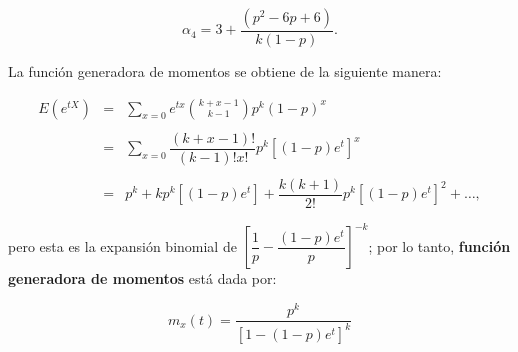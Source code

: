 \begin{tcolorbox}
    $$\alpha_4 = 3+\dfrac{(p^2-6p+6)}{k(1-p)}.$$
\end{tcolorbox}

La función generadora de momentos se obtiene de la siguiente manera:

$$\begin{array}{rcl}
    E(e^{tX})&=&\sum_{x=0}e^{tx} {k+x-1 \choose k-1} p^k(1-p)^x \\\\
	     &=& \sum_{x=0} \dfrac{(k+x-1)!}{(k-1)!x!} p^k[(1-p)e^t]^x \\\\
	     &=& p^k + kp^k [(1-p)e^t] + \dfrac{k(k+1)}{2!} p^k[(1-p)e^t]^2 +\ldots,\\\\
\end{array}$$
pero esta es la expansión binomial de $\left[\dfrac{1}{p}-\dfrac{(1-p)e^t}{p}\right]^{-k}$; por lo tanto, \textbf{función generadora de momentos} está dada por:

\begin{tcolorbox}
    $$m_x(t)=\dfrac{p^k}{[1-(1-p)e^t]^k}$$
\end{tcolorbox}
